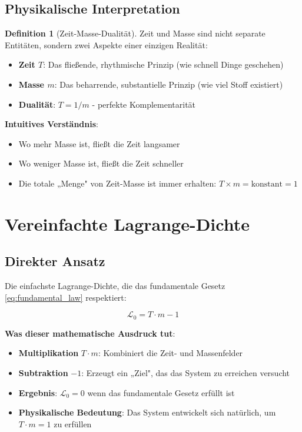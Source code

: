 \documentclass[12pt,a4paper]{article}
\newcommand{\Lag}{\mathcal{L}}
\theoremstyle{definition}
\newtheorem{definition}[theorem]{Definition}
\theoremstyle{remark}
\begin{document}
	\subsection{Physikalische Interpretation}
	
	\begin{definition}[Zeit-Masse-Dualität]
		Zeit und Masse sind nicht separate Entitäten, sondern zwei Aspekte einer einzigen Realität:
		\begin{itemize}
			\item \textbf{Zeit $T$}: Das fließende, rhythmische Prinzip (wie schnell Dinge geschehen)
			\item \textbf{Masse $m$}: Das beharrende, substantielle Prinzip (wie viel Stoff existiert)
			\item \textbf{Dualität}: $T = 1/m$ - perfekte Komplementarität
		\end{itemize}
	\end{definition}
	
	\textbf{Intuitives Verständnis}: 
	\begin{itemize}
		\item Wo mehr Masse ist, fließt die Zeit langsamer
		\item Wo weniger Masse ist, fließt die Zeit schneller  
		\item Die totale „Menge" von Zeit-Masse ist immer erhalten: $T \times m = \text{konstant} = 1$
	\end{itemize}
	
	\section{Vereinfachte Lagrange-Dichte}
	
	\subsection{Direkter Ansatz}
	
	Die einfachste Lagrange-Dichte, die das fundamentale Gesetz \eqref{eq:fundamental_law} respektiert:
	
	\begin{equation}
		\boxed{\Lag_0 = T \cdot m - 1}
		\label{eq:simple_lagrangian}
	\end{equation}
	
	\textbf{Was dieser mathematische Ausdruck tut}:
	\begin{itemize}
		\item \textbf{Multiplikation} $T \cdot m$: Kombiniert die Zeit- und Massenfelder
		\item \textbf{Subtraktion} $-1$: Erzeugt ein „Ziel", das das System zu erreichen versucht
		\item \textbf{Ergebnis}: $\Lag_0 = 0$ wenn das fundamentale Gesetz erfüllt ist
		\item \textbf{Physikalische Bedeutung}: Das System entwickelt sich natürlich, um $T \cdot m = 1$ zu erfüllen
	\end{itemize}
	
\end{document}
